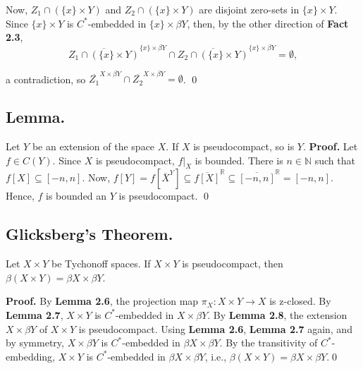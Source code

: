\documentclass{article}
\begin{document}
			  \vskip 10pt

			  Now, $Z_1\cap (\{x\}\times Y)$ and $Z_2\cap (\{x\} \times Y)$ are disjoint zero-sets in $\{x\}\times Y$. Since $\{x\}\times Y$ is $C^*$-embedded in $\{x\}\times \beta Y$, then, by the other direction of \textbf{Fact 2.3}, $$\overline{Z_1\cap (\{x\}\times Y)}^{\{x\}\times \beta Y} \cap \overline{Z_2\cap (\{x\}\times Y)}^{\{x\}\times \beta Y}=\emptyset,$$

			  a contradiction, so $\overline{Z_1}^{X\times \beta Y} \cap \overline{Z_2}^{X\times \beta Y} =\emptyset$.  \qed





			  \vskip 40pt


			  \subsection{Lemma.} Let $Y$ be an extension of the space $X$. If $X$ is pseudocompact, so is $Y$. 
			  \vskip 20pt
			  \textbf{Proof.} Let $f\in C(Y)$. Since $X$ is pseudocompact, $f|_X$ is bounded. There is $n\in \mathbb{N}$ such that $f[X]\subseteq [-n,n].$ Now, $f[Y]=f\left[\overline{X}^Y\right]\subseteq \overline{f[X]}^\mathbb{R} \subseteq \overline{[-n,n]}^\mathbb{R}=[-n,n].$ Hence, $f$ is bounded an $Y$ is pseudocompact. \qed




			  \vskip 40pt

			  \subsection{Glicksberg's Theorem.} Let $X\times Y$ be Tychonoff spaces. If $X\times Y$ is pseudocompact, then $\beta(X\times Y)=\beta X\times \beta Y$. 

			  \vskip 20pt

			  \textbf{Proof. } By \textbf{Lemma 2.6}, the projection map $\pi_X: X\times Y\rightarrow X$ is z-closed. By \textbf{Lemma 2.7}, $X\times Y$ is $C^*$-embedded in $X\times \beta Y$. By \textbf{Lemma 2.8}, the extension $X\times \beta Y$ of $X\times Y$ is pseudocompact. Using \textbf{Lemma 2.6}, \textbf{Lemma 2.7} again, and by symmetry, $X\times \beta Y$ is $C^*$-embedded in $\beta X\times \beta Y$. By the transitivity of $C^*$-embedding, $X\times Y$ is $C^*$-embedded in $\beta X\times \beta Y$, i.e., $\beta (X\times Y)=\beta X\times \beta Y$.\qed
\end{document}
